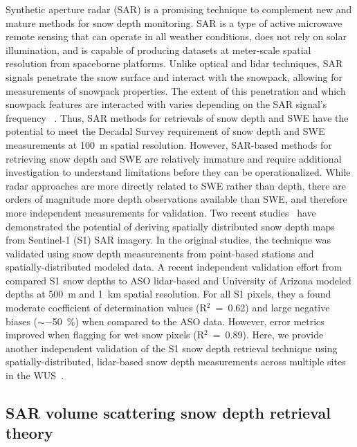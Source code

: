 \documentclass[journal abbreviation, manuscript]{copernicus}
\begin{document}
Synthetic aperture radar (SAR) is a promising technique to complement new and mature methods for snow depth monitoring. SAR is a type of active microwave remote sensing that can operate in all weather conditions, does not rely on solar illumination, and is capable of producing datasets at meter-scale spatial resolution from spaceborne platforms. Unlike optical and lidar techniques, SAR signals penetrate the snow surface and interact with the snowpack, allowing for measurements of snowpack properties. The extent of this penetration and which snowpack features are interacted with varies depending on the SAR signal's frequency ~\citep{Rosen.2000, Tsai.2019, Marshall.2021}. Thus, SAR methods for retrievals of snow depth and SWE have the potential to meet the \citet{Sciences.2018} Decadal Survey requirement of snow depth and SWE measurements at 100~m spatial resolution. However, SAR-based methods for retrieving snow depth and SWE are relatively immature and require additional investigation to understand limitations before they can be operationalized. While radar approaches are more directly related to SWE rather than depth, there are orders of magnitude more depth observations available than SWE, and therefore more independent measurements for validation. Two recent studies~\citep{Lievens.2019, Lievens.2022} have demonstrated the potential of deriving spatially distributed snow depth maps from Sentinel-1 (S1) SAR imagery. In the original studies, the technique was validated using snow depth measurements from point-based stations and spatially-distributed modeled data. A recent independent validation effort from \citet{Broxton.2024} compared S1 snow depths to ASO lidar-based and University of Arizona \citep{Broxton.2016} modeled depths at 500~m and 1~km spatial resolution. For all S1 pixels, they a found moderate coefficient of determination values (R$^2$~=~0.62) and large negative biases ($\sim$$-$50~\%) when compared to the ASO data. However, error metrics improved when flagging for wet snow pixels (R$^2$~=~0.89). Here, we provide another independent validation of the S1 snow depth retrieval technique using spatially-distributed, lidar-based snow depth measurements across multiple sites in the WUS~\citep{Abedisi.2022}. 

\subsection{SAR volume scattering snow depth retrieval theory}
\end{document}

